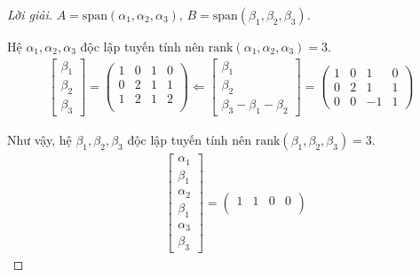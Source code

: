 \documentclass[class=linearalgebra,crop=false]{standalone}
\begin{document}
\begin{proof}[Lời giải]$A = \text{span}(\alpha_{1},\alpha_{2},\alpha_{3})$, $B = \text{span}(\beta_{1},\beta_{2},\beta_{3})$.
    \par Hệ $\alpha_{1}, \alpha_{2}, \alpha_{3}$ độc lập tuyến tính nên $\text{rank}(\alpha_{1}, \alpha_{2}, \alpha_{3}) = 3$.
    \begin{align*}
        \begin{bmatrix}
            \beta_{1} \\
            \beta_{2} \\
            \beta_{3}
        \end{bmatrix}=
        \begin{pmatrix}
            1 & 0 & 1 & 0 \\
            0 & 2 & 1 & 1 \\
            1 & 2 & 1 & 2 \\
        \end{pmatrix}
        \Longleftarrow
        \begin{bmatrix}
            \beta_{1} \\
            \beta_{2} \\
            \beta_{3} - \beta_{1} - \beta_{2}
        \end{bmatrix}=
        \begin{pmatrix}
            1 & 0 & 1  & 0 \\
            0 & 2 & 1  & 1 \\
            0 & 0 & -1 & 1
        \end{pmatrix}
    \end{align*}
    \par Như vậy, hệ $\beta_{1}, \beta_{2}, \beta_{3}$ độc lập tuyến tính nên $\text{rank}(\beta_{1}, \beta_{2}, \beta_{3}) = 3$.
    \begin{align*}
                        & \begin{bmatrix}
                              \alpha_{1} \\
                              \beta_{1}  \\
                              \alpha_{2} \\
                              \beta_{1}  \\
                              \alpha_{3} \\
                              \beta_{3}
                          \end{bmatrix}=
        \begin{pmatrix}
            1 & 1 & 0 & 0 \\

\end{pmatrix}
\end{align*}
\end{proof}
\end{document}
